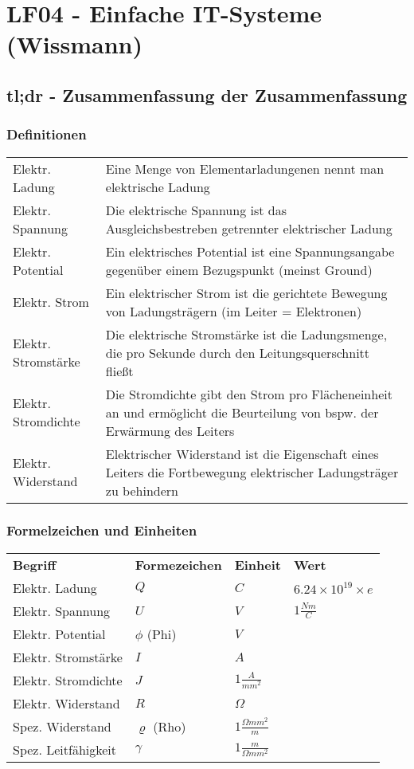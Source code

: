 \section{LF04 - Einfache IT-Systeme (Wissmann)}


\subsection{tl;dr - Zusammenfassung der Zusammenfassung}

\subsubsection{Definitionen}
\begin{tabular}{	p{}
				p{}}
Elektr. Ladung & Eine Menge von Elementarladungenen nennt man elektrische Ladung\\
Elektr. Spannung & Die elektrische Spannung ist das Ausgleichsbestreben getrennter elektrischer Ladung\\
Elektr. Potential & Ein elektrisches Potential ist eine Spannungsangabe gegenüber einem Bezugspunkt (meinst Ground)\\
Elektr. Strom & Ein elektrischer Strom ist die gerichtete Bewegung von Ladungsträgern (im Leiter = Elektronen)\\
Elektr. Stromstärke & Die elektrische Stromstärke ist die Ladungsmenge, die pro Sekunde durch den Leitungsquerschnitt fließt\\
Elektr. Stromdichte & Die Stromdichte gibt den Strom pro Flächeneinheit an und ermöglicht die Beurteilung von bspw. der Erwärmung des Leiters\\
Elektr. Widerstand & Elektrischer Widerstand ist die Eigenschaft eines Leiters die Fortbewegung elektrischer Ladungsträger zu behindern\\
\end{tabular}

\subsubsection{Formelzeichen und Einheiten}
\begin{tabular}{llll}
{\bf Begriff}		& {\bf Formezeichen} & {\bf Einheit} & {\bf Wert}\\
Elektr. Ladung		& $Q$ & $C$ & $6.24 \times 10^{19} \times e$\\
Elektr. Spannung		& $U$ & $V$ & $1\frac{Nm}{C}$\\
Elektr. Potential	& $\phi$ (Phi) & $V$ & \\
Elektr. Stromstärke	& $I$ & $A$ & \\
Elektr. Stromdichte	& $J$ & $1\frac{A}{mm^2}$ & \\
Elektr. Widerstand	& $R$ & $\Omega$ & \\
Spez. Widerstand		& $\varrho$ (Rho) & $1\frac{\Omega mm^2}{m}$ & \\
Spez. Leitfähigkeit	& $\gamma$ & $1\frac{m}{\Omega mm^2}$ & \\
\end{tabular}

